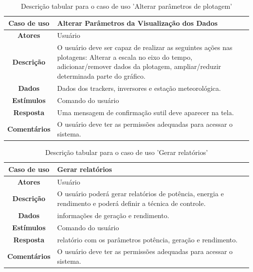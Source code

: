 \documentclass[a4paper,12pt]{article}
\begin{document}
\begin{table}[htbp]
\begin{center}
\begin{tabular}{|c|p{12cm}|}
\hline
\cellcolor{gray} \textbf{Caso de uso} &  Alterar Parâmetros da Visualização dos Dados\\
\hline
\cellcolor{gray} \textbf{Atores}  & Usuário \\
\hline
\cellcolor{gray} \textbf{Descrição} &   O usuário deve ser capaz de realizar as seguintes ações nas plotagens: Alterar a escala no eixo do tempo, adicionar/remover dados da plotagem, ampliar/reduzir determinada parte do gráfico.      \\
\hline
\cellcolor{gray} \textbf{Dados} &  Dados dos trackers, inversores e estação meteorológica. \\ 
\hline
\cellcolor{gray} \textbf{Estímulos} & Comando do usuário \\
\hline
\cellcolor{gray} \textbf{Resposta} & Uma mensagem de confirmação sutil deve aparecer na tela. \\
\hline
\cellcolor{gray} \textbf{Comentários} & O usuário deve ter as permissões adequadas para acessar o sistema.\\
\hline
\end{tabular}
\caption{Descrição tabular para o caso de uso 'Alterar parâmetros de plotagem'}
\label{tab:alterar_P}
\end{center}
\end{table}



\begin{table}[htbp]
\begin{center}
\begin{tabular}{|c|p{12cm}|}
\hline
\cellcolor{gray} \textbf{Caso de uso} &  Gerar relatórios\\
\hline
\cellcolor{gray} \textbf{Atores}  & Usuário \\
\hline
\cellcolor{gray} \textbf{Descrição} &   O usuário poderá gerar relatórios de potência, energia e rendimento e poderá definir a técnica de controle.      \\
\hline
\cellcolor{gray} \textbf{Dados} &  informações de geração e rendimento. \\ 
\hline
\cellcolor{gray} \textbf{Estímulos} & Comando do usuário \\
\hline
\cellcolor{gray} \textbf{Resposta} & relatório com os parâmetros potência, geração e rendimento. \\
\hline
\cellcolor{gray} \textbf{Comentários} & O usuário deve ter as permissões adequadas para acessar o sistema.\\
\hline
\end{tabular}
\caption{Descrição tabular para o caso de uso 'Gerar relatórios'}
\label{tab:gerar_R}
\end{center}
\end{table}
\end{document}
